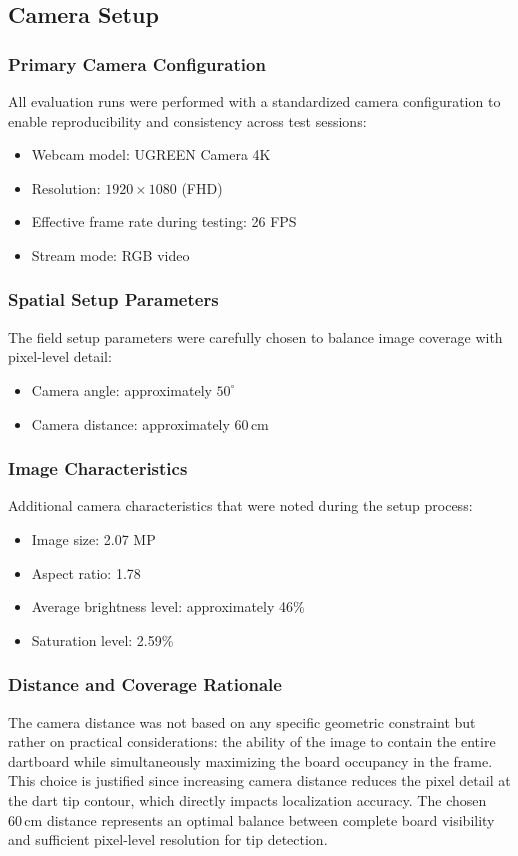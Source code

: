 \subsection{Camera Setup}\label{subsec:eval_camera_setup}

\subsubsection{Primary Camera Configuration}
All evaluation runs were performed with a standardized camera configuration to enable reproducibility and consistency across test sessions:

\begin{itemize}
	\item Webcam model: UGREEN Camera 4K
	\item Resolution: $1920 \times 1080$ (FHD)
	\item Effective frame rate during testing: 26 FPS
	\item Stream mode: RGB video
\end{itemize}

\subsubsection{Spatial Setup Parameters}
The field setup parameters were carefully chosen to balance image coverage with pixel-level detail:
\begin{itemize}
	\item Camera angle: approximately $50^{\circ}$
	\item Camera distance: approximately $60\,\mathrm{cm}$
\end{itemize}

\subsubsection{Image Characteristics}
Additional camera characteristics that were noted during the setup process:
\begin{itemize}
	\item Image size: 2.07 MP
	\item Aspect ratio: 1.78
	\item Average brightness level: approximately 46\%
	\item Saturation level: 2.59\%
\end{itemize}

\subsubsection{Distance and Coverage Rationale}
The camera distance was not based on any specific geometric constraint but rather on practical considerations: the ability of the image to contain the entire dartboard while simultaneously maximizing the board occupancy in the frame. This choice is justified since increasing camera distance reduces the pixel detail at the dart tip contour, which directly impacts localization accuracy. The chosen $60\,\mathrm{cm}$ distance represents an optimal balance between complete board visibility and sufficient pixel-level resolution for tip detection.

